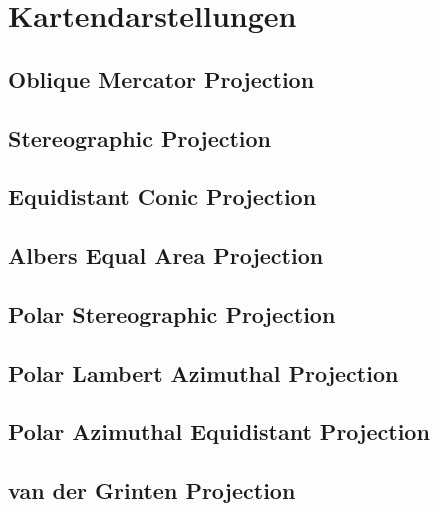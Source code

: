 \section{Kartendarstellungen}
\label{sec:2}
 















\subsection{Oblique Mercator Projection}
\label{sec:2.17}






\subsection{Stereographic Projection}
\label{sec:2.24}
\subsection{Equidistant Conic Projection}
\label{sec:2.25}
\subsection{Albers Equal Area Projection}
\label{sec:2.26}
\subsection{Polar Stereographic Projection}
\label{sec:2.27}
\subsection{Polar Lambert Azimuthal Projection}
\label{sec:2.28}
\subsection{Polar Azimuthal Equidistant Projection}
\label{sec:2.29}
\subsection{van der Grinten Projection}
\label{sec:2.30}
